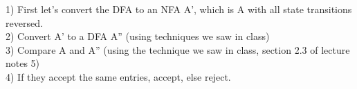 
1) First let's convert the DFA to an NFA A', which is A with all state transitions reversed. \\

2) Convert A' to a DFA A'' (using techniques we saw in class) \\

3) Compare A and A'' (using the technique we saw in class, section 2.3 of lecture notes 5) \\

4) If they accept the same entries, accept, else reject.